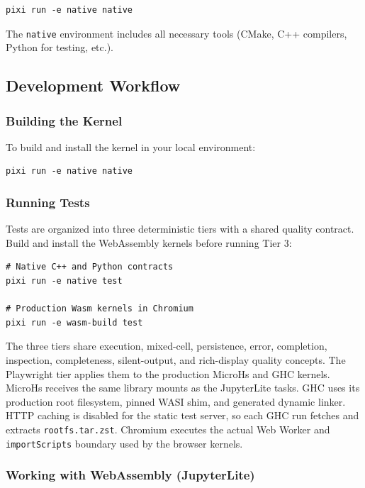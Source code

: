 \documentclass[11pt]{scrartcl}
\begin{document}
\begin{verbatim}
pixi run -e native native
\end{verbatim}


The \texttt{native} environment includes all necessary tools (CMake, C++ compilers, Python for testing, etc.).
\subsection{Development Workflow}


\subsubsection{Building the Kernel}


To build and install the kernel in your local environment:
\begin{verbatim}
pixi run -e native native
\end{verbatim}


\subsubsection{Running Tests}


Tests are organized into three deterministic tiers with a shared quality
contract. Build and install the WebAssembly kernels before running Tier 3:
\begin{verbatim}
# Native C++ and Python contracts
pixi run -e native test

# Production Wasm kernels in Chromium
pixi run -e wasm-build test
\end{verbatim}

The three tiers share execution, mixed-cell, persistence, error, completion,
inspection, completeness, silent-output, and rich-display quality concepts.
The Playwright tier applies them to the production MicroHs and GHC kernels.
MicroHs receives the same library mounts as the JupyterLite tasks. GHC uses its
production root filesystem, pinned WASI shim, and generated dynamic linker.
HTTP caching is disabled for the static test server, so each GHC run fetches
and extracts \texttt{rootfs.tar.zst}. Chromium executes the actual
Web Worker and \texttt{importScripts} boundary used by the browser kernels.


\subsubsection{Working with WebAssembly (JupyterLite)}
\end{document}
